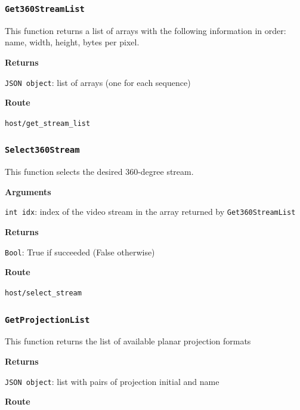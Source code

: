 \documentclass{article}
\begin{document}

\subsubsection*{\texttt{Get360StreamList}}

This function returns a list of arrays with the following information in order: name, width, height, bytes per pixel.

\textbf{Returns}

\texttt{JSON object}: list of arrays (one for each sequence)

\textbf{Route}

\texttt{host/get_stream_list}


\subsubsection*{\texttt{Select360Stream}}

This function selects the desired 360-degree stream.

\textbf{Arguments}

\texttt{int idx}: index of the video stream in the array returned by \texttt{Get360StreamList}

\textbf{Returns}

\texttt{Bool}: True if succeeded (False otherwise)

\textbf{Route}

\texttt{host/select_stream}


\subsubsection*{\texttt{GetProjectionList}}

This function returns the list of available planar projection formats

\textbf{Returns}

\texttt{JSON object}: list with pairs of projection initial and name

\textbf{Route}
\end{document}
